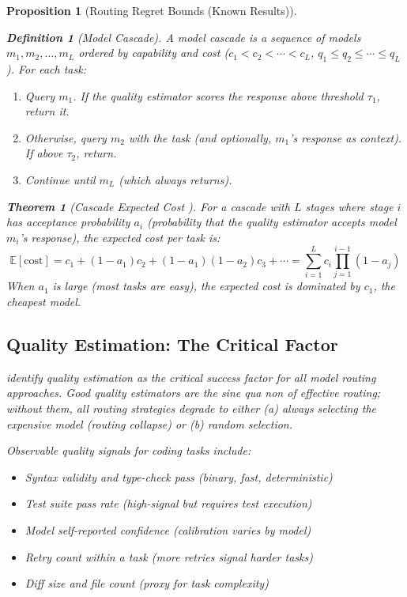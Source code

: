 \documentclass[11pt, a4paper, copyright]{googledeepmind}
\newtheorem{definition}{Definition}[section]
\newtheorem{theorem}{Theorem}[section]
\newtheorem{proposition}{Proposition}[section]
\begin{document}
\begin{proposition}[Routing Regret Bounds (Known Results)]
\begin{definition}[Model Cascade]
A \emph{model cascade} is a sequence of models $m_1, m_2, \ldots, m_L$ ordered by capability and cost ($c_1 < c_2 < \cdots < c_L$, $q_1 \leq q_2 \leq \cdots \leq q_L$). For each task:
\begin{enumerate}
\item Query $m_1$. If the quality estimator scores the response above threshold $\tau_1$, return it.
\item Otherwise, query $m_2$ with the task (and optionally, $m_1$'s response as context). If above $\tau_2$, return.
\item Continue until $m_L$ (which always returns).
\end{enumerate}
\end{definition}

\begin{theorem}[Cascade Expected Cost {\citep{violajones2004}}]
\label{thm:cascadecost}
For a cascade with $L$ stages where stage $i$ has acceptance probability $a_i$ (probability that the quality estimator accepts model $m_i$'s response), the expected cost per task is:
\begin{equation}
\mathbb{E}[\text{cost}] = c_1 + (1 - a_1) c_2 + (1 - a_1)(1 - a_2) c_3 + \cdots = \sum_{i=1}^{L} c_i \prod_{j=1}^{i-1}(1 - a_j)
\end{equation}
When $a_1$ is large (most tasks are easy), the expected cost is dominated by $c_1$, the cheapest model.
\end{theorem}

\subsection{Quality Estimation: The Critical Factor}

\citet{dekoninck2025cascade} identify quality estimation as the critical success factor for all model routing approaches. Good quality estimators are the sine qua non of effective routing; without them, all routing strategies degrade to either (a) always selecting the expensive model (routing collapse) or (b) random selection.

Observable quality signals for coding tasks include:
\begin{itemize}
\item Syntax validity and type-check pass (binary, fast, deterministic)
\item Test suite pass rate (high-signal but requires test execution)
\item Model self-reported confidence (calibration varies by model)
\item Retry count within a task (more retries signal harder tasks)
\item Diff size and file count (proxy for task complexity)
\end{itemize}


\end{proposition}
\end{document}
